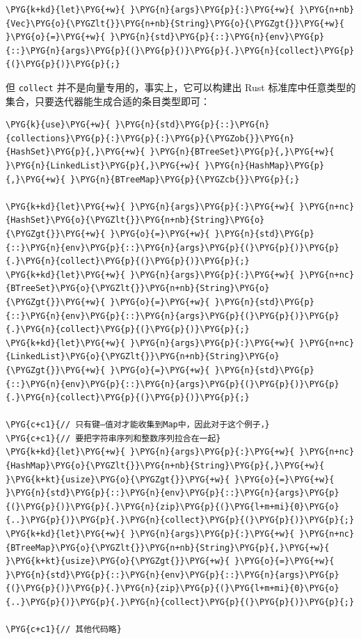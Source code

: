 \begin{Verbatim}[commandchars=\\\{\},breaklines=true,breakanywhere=true,fontsize=\codefont,xleftmargin=17bp]
\PYG{k+kd}{let}\PYG{+w}{ }\PYG{n}{args}\PYG{p}{:}\PYG{+w}{ }\PYG{n+nb}{Vec}\PYG{o}{\PYGZlt{}}\PYG{n+nb}{String}\PYG{o}{\PYGZgt{}}\PYG{+w}{ }\PYG{o}{=}\PYG{+w}{ }\PYG{n}{std}\PYG{p}{::}\PYG{n}{env}\PYG{p}{::}\PYG{n}{args}\PYG{p}{(}\PYG{p}{)}\PYG{p}{.}\PYG{n}{collect}\PYG{p}{(}\PYG{p}{)}\PYG{p}{;}
\end{Verbatim}

但 \texttt{collect} 并不是向量专用的，事实上，它可以构建出 Rust 标准库中任意类型的集合，只要迭代器能生成合适的条目类型即可：

\begin{Verbatim}[commandchars=\\\{\},breaklines=true,breakanywhere=true,fontsize=\codefont,xleftmargin=17bp]
\PYG{k}{use}\PYG{+w}{ }\PYG{n}{std}\PYG{p}{::}\PYG{n}{collections}\PYG{p}{:}\PYG{p}{:}\PYG{p}{\PYGZob{}}\PYG{n}{HashSet}\PYG{p}{,}\PYG{+w}{ }\PYG{n}{BTreeSet}\PYG{p}{,}\PYG{+w}{ }\PYG{n}{LinkedList}\PYG{p}{,}\PYG{+w}{ }\PYG{n}{HashMap}\PYG{p}{,}\PYG{+w}{ }\PYG{n}{BTreeMap}\PYG{p}{\PYGZcb{}}\PYG{p}{;}

\PYG{k+kd}{let}\PYG{+w}{ }\PYG{n}{args}\PYG{p}{:}\PYG{+w}{ }\PYG{n+nc}{HashSet}\PYG{o}{\PYGZlt{}}\PYG{n+nb}{String}\PYG{o}{\PYGZgt{}}\PYG{+w}{ }\PYG{o}{=}\PYG{+w}{ }\PYG{n}{std}\PYG{p}{::}\PYG{n}{env}\PYG{p}{::}\PYG{n}{args}\PYG{p}{(}\PYG{p}{)}\PYG{p}{.}\PYG{n}{collect}\PYG{p}{(}\PYG{p}{)}\PYG{p}{;}
\PYG{k+kd}{let}\PYG{+w}{ }\PYG{n}{args}\PYG{p}{:}\PYG{+w}{ }\PYG{n+nc}{BTreeSet}\PYG{o}{\PYGZlt{}}\PYG{n+nb}{String}\PYG{o}{\PYGZgt{}}\PYG{+w}{ }\PYG{o}{=}\PYG{+w}{ }\PYG{n}{std}\PYG{p}{::}\PYG{n}{env}\PYG{p}{::}\PYG{n}{args}\PYG{p}{(}\PYG{p}{)}\PYG{p}{.}\PYG{n}{collect}\PYG{p}{(}\PYG{p}{)}\PYG{p}{;}
\PYG{k+kd}{let}\PYG{+w}{ }\PYG{n}{args}\PYG{p}{:}\PYG{+w}{ }\PYG{n+nc}{LinkedList}\PYG{o}{\PYGZlt{}}\PYG{n+nb}{String}\PYG{o}{\PYGZgt{}}\PYG{+w}{ }\PYG{o}{=}\PYG{+w}{ }\PYG{n}{std}\PYG{p}{::}\PYG{n}{env}\PYG{p}{::}\PYG{n}{args}\PYG{p}{(}\PYG{p}{)}\PYG{p}{.}\PYG{n}{collect}\PYG{p}{(}\PYG{p}{)}\PYG{p}{;}

\PYG{c+c1}{// 只有键–值对才能收集到Map中，因此对于这个例子，}
\PYG{c+c1}{// 要把字符串序列和整数序列拉合在一起}
\PYG{k+kd}{let}\PYG{+w}{ }\PYG{n}{args}\PYG{p}{:}\PYG{+w}{ }\PYG{n+nc}{HashMap}\PYG{o}{\PYGZlt{}}\PYG{n+nb}{String}\PYG{p}{,}\PYG{+w}{ }\PYG{k+kt}{usize}\PYG{o}{\PYGZgt{}}\PYG{+w}{ }\PYG{o}{=}\PYG{+w}{ }\PYG{n}{std}\PYG{p}{::}\PYG{n}{env}\PYG{p}{::}\PYG{n}{args}\PYG{p}{(}\PYG{p}{)}\PYG{p}{.}\PYG{n}{zip}\PYG{p}{(}\PYG{l+m+mi}{0}\PYG{o}{..}\PYG{p}{)}\PYG{p}{.}\PYG{n}{collect}\PYG{p}{(}\PYG{p}{)}\PYG{p}{;}
\PYG{k+kd}{let}\PYG{+w}{ }\PYG{n}{args}\PYG{p}{:}\PYG{+w}{ }\PYG{n+nc}{BTreeMap}\PYG{o}{\PYGZlt{}}\PYG{n+nb}{String}\PYG{p}{,}\PYG{+w}{ }\PYG{k+kt}{usize}\PYG{o}{\PYGZgt{}}\PYG{+w}{ }\PYG{o}{=}\PYG{+w}{ }\PYG{n}{std}\PYG{p}{::}\PYG{n}{env}\PYG{p}{::}\PYG{n}{args}\PYG{p}{(}\PYG{p}{)}\PYG{p}{.}\PYG{n}{zip}\PYG{p}{(}\PYG{l+m+mi}{0}\PYG{o}{..}\PYG{p}{)}\PYG{p}{.}\PYG{n}{collect}\PYG{p}{(}\PYG{p}{)}\PYG{p}{;}

\PYG{c+c1}{// 其他代码略}
\end{Verbatim}

